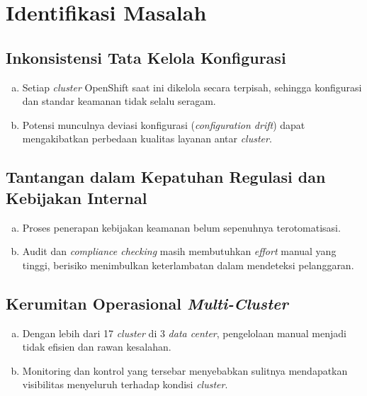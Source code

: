 \section{Identifikasi Masalah}

\subsection{Inkonsistensi Tata Kelola Konfigurasi}
\begin{adjustwidth}{0.5cm}{0cm}
  \begin{enumerate}[a.]
    \item Setiap \emph{cluster} OpenShift saat ini dikelola secara terpisah, sehingga konfigurasi dan standar keamanan tidak selalu seragam.
    \item Potensi munculnya deviasi konfigurasi (\emph{configuration drift}) dapat mengakibatkan perbedaan kualitas layanan antar \emph{cluster}.
  \end{enumerate}
\end{adjustwidth}

\subsection{Tantangan dalam Kepatuhan Regulasi dan Kebijakan Internal}
\begin{adjustwidth}{0.5cm}{0cm}
  \begin{enumerate}[a.]
    \item Proses penerapan kebijakan keamanan belum sepenuhnya terotomatisasi.
    \item Audit dan \emph{compliance checking} masih membutuhkan \emph{effort} manual yang tinggi, berisiko menimbulkan keterlambatan dalam mendeteksi pelanggaran.
  \end{enumerate}
\end{adjustwidth}

\subsection{Kerumitan Operasional \emph{Multi-Cluster}}
\begin{adjustwidth}{0.5cm}{0cm}
  \begin{enumerate}[a.]
    \item Dengan lebih dari 17 \emph{cluster} di 3 \emph{data center}, pengelolaan manual menjadi tidak efisien dan rawan kesalahan.
    \item Monitoring dan kontrol yang tersebar menyebabkan sulitnya mendapatkan visibilitas menyeluruh terhadap kondisi \emph{cluster}.
  \end{enumerate}
\end{adjustwidth}

